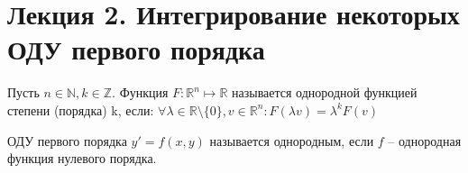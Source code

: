 \documentclass[document.tex]{subfiles}
\begin{document}
\section*{Лекция 2. Интегрирование некоторых ОДУ первого порядка}
\begin{Definition}
Пусть $n \in \mathbb{N}, k \in \mathbb{Z}$. Функция $F : \mathbb{R}^n \mapsto \mathbb{R}$ называется однородной функцией степени (порядка) k, если: $\forall \lambda \in \mathbb{R} \setminus \{0\}, v \in \mathbb{R}^n: F(\lambda v) = \lambda^k F(v)$
\end{Definition}
\begin{Definition}
\label{homogen_diff_eq_def1}
ОДУ первого порядка $y' = f(x, y)$ называется однородным, если $f$ -- однородная функция нулевого порядка.
\end{Definition}
\end{document}
